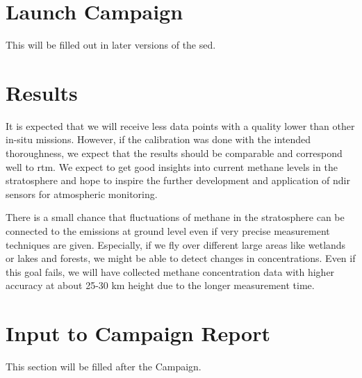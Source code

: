 \documentclass[12pt,a4paper]{report}
\begin{document}
\section{Launch Campaign}
This will be filled out in later versions of the \ac{sed}.

\section{Results}

It is expected that we will receive less data points with a quality lower than other in-situ missions. However, if the calibration was done with the intended thoroughness, we expect that the results should be comparable and correspond well to \ac{rtm}. We expect to get good insights into current methane levels in the stratosphere and hope to inspire the further development and application of \ac{ndir} sensors for atmospheric monitoring.

There is a small chance that fluctuations of methane in the stratosphere can be connected to the emissions at ground level even if very precise measurement techniques are given. Especially, if we fly over different large areas like wetlands or lakes and forests, we might be able to detect changes in concentrations. Even if this goal fails, we will have collected methane concentration data with higher accuracy at about 25-30 km height due to the longer measurement time.

\section{Input to Campaign Report}
This section will be filled after the Campaign.
\end{document}
